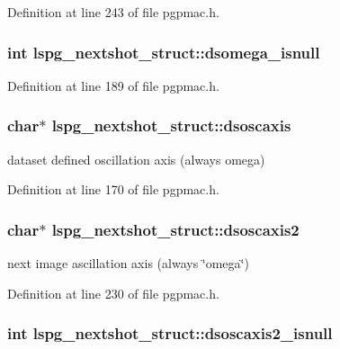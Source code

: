 Definition at line 243 of file pgpmac.h.\hypertarget{structlspg__nextshot__struct_ad1da3548dc642d415aed53dc165c44fc}{
\subsubsection[{dsomega\_\-isnull}]{\setlength{\rightskip}{0pt plus 5cm}int {\bf lspg\_\-nextshot\_\-struct::dsomega\_\-isnull}}}
\label{structlspg__nextshot__struct_ad1da3548dc642d415aed53dc165c44fc}


Definition at line 189 of file pgpmac.h.\hypertarget{structlspg__nextshot__struct_a9a62c304e66013e8e5e5618a44f0b6d4}{
\subsubsection[{dsoscaxis}]{\setlength{\rightskip}{0pt plus 5cm}char$\ast$ {\bf lspg\_\-nextshot\_\-struct::dsoscaxis}}}
\label{structlspg__nextshot__struct_a9a62c304e66013e8e5e5618a44f0b6d4}


dataset defined oscillation axis (always omega) 

Definition at line 170 of file pgpmac.h.\hypertarget{structlspg__nextshot__struct_ac86005a6e90ff502da9e95b59d0b7a5f}{
\subsubsection[{dsoscaxis2}]{\setlength{\rightskip}{0pt plus 5cm}char$\ast$ {\bf lspg\_\-nextshot\_\-struct::dsoscaxis2}}}
\label{structlspg__nextshot__struct_ac86005a6e90ff502da9e95b59d0b7a5f}


next image ascillation axis (always \char`\"{}omega\char`\"{}) 

Definition at line 230 of file pgpmac.h.\hypertarget{structlspg__nextshot__struct_a98e280e99ae847559bb82836df3c32d1}{
\subsubsection[{dsoscaxis2\_\-isnull}]{\setlength{\rightskip}{0pt plus 5cm}int {\bf lspg\_\-nextshot\_\-struct::dsoscaxis2\_\-isnull}}}
\label{structlspg__nextshot__struct_a98e280e99ae847559bb82836df3c32d1}


